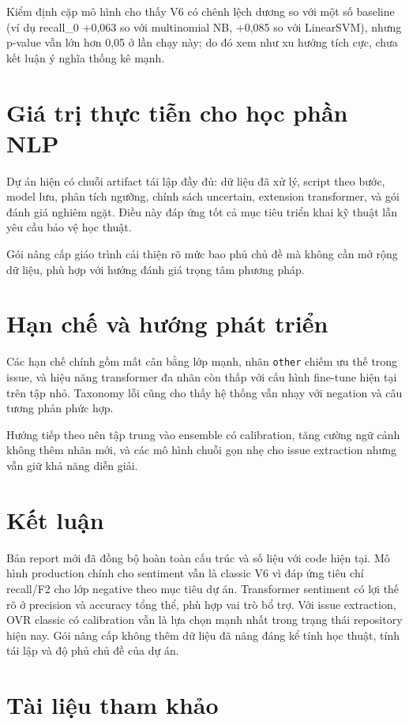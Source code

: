 ﻿\documentclass[12pt,a4paper]{article}
\begin{document}
Kiểm định cặp mô hình cho thấy V6 có chênh lệch dương so với một số baseline (ví dụ recall\_0 +0,063 so với multinomial NB, +0,085 so với LinearSVM), nhưng p-value vẫn lớn hơn 0,05 ở lần chạy này; do đó xem như xu hướng tích cực, chưa kết luận ý nghĩa thống kê mạnh.

\section{Giá trị thực tiễn cho học phần NLP}
Dự án hiện có chuỗi artifact tái lập đầy đủ: dữ liệu đã xử lý, script theo bước, model lưu, phân tích ngưỡng, chính sách uncertain, extension transformer, và gói đánh giá nghiêm ngặt. Điều này đáp ứng tốt cả mục tiêu triển khai kỹ thuật lẫn yêu cầu bảo vệ học thuật.

Gói nâng cấp giáo trình cải thiện rõ mức bao phủ chủ đề mà không cần mở rộng dữ liệu, phù hợp với hướng đánh giá trọng tâm phương pháp.

\section{Hạn chế và hướng phát triển}
Các hạn chế chính gồm mất cân bằng lớp mạnh, nhãn \texttt{other} chiếm ưu thế trong issue, và hiệu năng transformer đa nhãn còn thấp với cấu hình fine-tune hiện tại trên tập nhỏ. Taxonomy lỗi cũng cho thấy hệ thống vẫn nhạy với negation và câu tương phản phức hợp.

Hướng tiếp theo nên tập trung vào ensemble có calibration, tăng cường ngữ cảnh không thêm nhãn mới, và các mô hình chuỗi gọn nhẹ cho issue extraction nhưng vẫn giữ khả năng diễn giải.

\section{Kết luận}
Bản report mới đã đồng bộ hoàn toàn cấu trúc và số liệu với code hiện tại. Mô hình production chính cho sentiment vẫn là classic V6 vì đáp ứng tiêu chí recall/F2 cho lớp negative theo mục tiêu dự án. Transformer sentiment có lợi thế rõ ở precision và accuracy tổng thể, phù hợp vai trò bổ trợ. Với issue extraction, OVR classic có calibration vẫn là lựa chọn mạnh nhất trong trạng thái repository hiện nay. Gói nâng cấp không thêm dữ liệu đã nâng đáng kể tính học thuật, tính tái lập và độ phủ chủ đề của dự án.

\clearpage
\section*{Tài liệu tham khảo}
\end{document}
